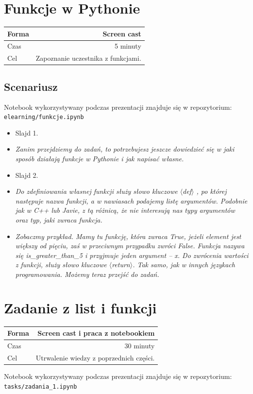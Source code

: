 \documentclass{mwart}
\begin{document}
\section{Funkcje w Pythonie}
\begin{center}
  \begin{tabular}{lr}
    \toprule
    Forma & Screen cast \\
    \midrule
    Czas & 5 minuty \\
    Cel & Zapoznanie uczestnika z funkcjami. \\
    \bottomrule
  \end{tabular}
\end{center}

\subsection{Scenariusz}
Notebook wykorzystywany podczas prezentacji znajduje się w repozytorium:
\texttt{elearning/funkcje.ipynb}
\begin{itemize}
  \item Slajd 1.
  \item \emph{Zanim przejdziemy do zadań, to potrzebujesz jeszcze dowiedzieć się w jaki
      sposób działają funkcje w Pythonie i jak napisać własne.}
  \item Slajd 2.
  \item \emph{Do zdefiniowania własnej funkcji służy słowo kluczowe $\langle$def$\rangle$ , po której
      następuje nazwa funkcji, a w nawiasach podajemy listę argumentów. Podobnie jak w
      C++ lub Javie, z tą różnicą, że nie interesują nas typy argumentów oraz typ, jaki
      zwraca funkcja.}
  \item \emph{Zobaczmy przykład. Mamy tu funkcję, która zwraca True, jeżeli element jest
      większy od pięciu, zaś w przeciwnym przypadku zwróci False. Funkcja nazywa się
      is\_greater\_than\_5 i przyjmuje jeden argument --  x. Do zwrócenia wartości z
      funkcji, służy słowo kluczowe $\langle$return$\rangle$. Tak samo, jak w innych językach
      programowania. Możemy teraz przejść do zadań.}
\end{itemize}

\section{Zadanie z list i funkcji}
\begin{center}
  \begin{tabular}{lr}
    \toprule
    Forma & Screen cast i praca z notebookiem \\
    \midrule
    Czas & 30 minuty \\
    Cel & Utrwalenie wiedzy z poprzednich części. \\
    \bottomrule
  \end{tabular}
\end{center}
Notebook wykorzystywany podczas prezentacji znajduje się w repozytorium:
\texttt{tasks/zadania\_1.ipynb}
\end{document}
